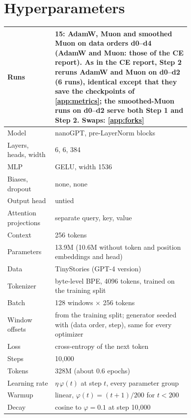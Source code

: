 \section{Hyperparameters}
\label{app:hparams}

\begin{center}\small
\captionsetup{type=table}
\caption{Hyperparameters shared by the AdamW, Muon and smoothed-Muon runs.}
\label{tab:app-shared}
\begin{tabular}{@{}lp{0.74\linewidth}@{}}
\hline
Runs & 15: AdamW, Muon and smoothed Muon on data orders d0--d4 (AdamW and Muon: those of the CE report). As in
  the CE report, Step 2 reruns AdamW and Muon on d0--d2 (6 runs), identical except that they save the
  checkpoints of \cref{app:metrics}; the smoothed-Muon runs on d0--d2 serve both Step 1 and Step 2. Swaps: \cref{app:forks} \\
\hline
Model & nanoGPT, pre-LayerNorm blocks \\
Layers, heads, width & 6, 6, 384 \\
MLP & GELU, width 1536 \\
Biases, dropout & none, none \\
Output head & untied \\
Attention projections & separate query, key, value \\
Context & 256 tokens \\
Parameters & 13.9M (10.6M without token and position embeddings and head) \\
\hline
Data & TinyStories (GPT-4 version) \\
Tokenizer & byte-level BPE, 4096 tokens, trained on the training split \\
Batch & 128 windows $\times$ 256 tokens \\
Window offsets & from the training split; generator seeded with (data order, step), same for every optimizer \\
\hline
Loss & cross-entropy of the next token \\
Steps & 10{,}000 \\
Tokens & 328M (about 0.6 epochs) \\
Learning rate & $\eta\,\varphi(t)$ at step $t$, every parameter group \\
Warmup & linear, $\varphi(t)=(t+1)/200$ for $t<200$ \\
Decay & cosine to $\varphi=0.1$ at step 10{,}000 \\

\end{tabular}
\end{center}
